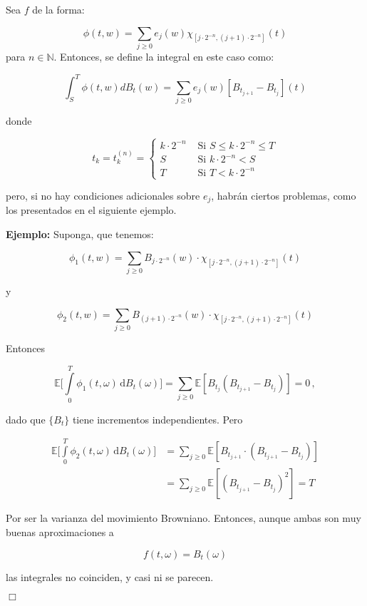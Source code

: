Sea $f$ de la forma:

\[
	\phi (t, w) = \sum_{j \geq 0} e_j (w) \chi_{ [j \cdot 2^{-n}, (j+1)\cdot 2^{-n}  ] }(t)
\]
para $n \in \mathbb{N}$. Entonces, se define la integral en este caso como:

\[
	\int_S^T \phi(t,w) dB_t(w) = \sum_{j \geq 0} e_j (w) [B_{t_{j+1}} - B_{t_j}] (t)
\]

donde

\[
	t_k = t_k^{(n)} = \left\{  \begin{array}{lr}
		k \cdot 2^{-n} & \text{ Si } S \leq k \cdot 2^{-n} \leq T \\
		S & \text{ Si } k \cdot 2^{-n} < S \\
		T & \text{ Si } T < k \cdot 2^{-n}
	\end{array} \right.
\]

pero, si no hay condiciones adicionales sobre $e_j$, habrán ciertos problemas, como los presentados en el siguiente ejemplo.

\textbf{Ejemplo:} Suponga, que tenemos:

\[
	\phi_1(t,w)  = \sum_{j \geq 0} B_{j \cdot 2^{-n} } (w) \cdot \chi_{ [j \cdot 2^{-n}, (j+1) \cdot 2^{-n} ]  } (t)
\]

y

\[
	\phi_2(t,w)  = \sum_{j \geq 0} B_{(j+1) \cdot 2^{-n} } (w) \cdot \chi_{ [j \cdot 2^{-n}, (j+1) \cdot 2^{-n} ]  } (t)
\]

Entonces

\[
\mathbb{E}\bigg[\int\limits_{0}^{T}\phi_{1}(t,\omega)\,\mathrm{d}B_{t}(\omega)\bigg] = \sum_{j \geq 0}\mathbb{E}[B_{t_{j}}(B_{t_{j+1}}-B_{t_{j}})] = 0\,,
\]

dado que $\{B_{t}\}$ tiene incrementos independientes. Pero

\begin{align*}
\mathbb{E}\bigg[\int\limits_{0}^{T}\phi_{2}(t,\omega)\,\mathrm{d}B_{t}(\omega)\bigg] &= \sum_{j\geq 0}\mathbb{E}[B_{t_{j+1}}\cdot(B_{t_{j+1}}-B_{t_{j}})] \\
&= \sum_{j\geq 0}\mathbb{E}[(B_{t_{j+1}}-B_{t_{j}})^{2}] = T
\end{align*}

Por ser la varianza del movimiento Browniano. Entonces, aunque ambas son muy buenas aproximaciones a 

\[
	f(t, \omega) = B_t (\omega)
\]

las integrales no coinciden, y casi ni se parecen.

\begin{flushright}
	$\Box$
\end{flushright}

